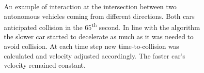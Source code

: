 \documentclass[11pt,english]{article}
\begin{document}
\begin{figure}[!] %
\caption{An example of interaction at the intersection between two autonomous vehicles coming from different directions. Both cars anticipated collision in the 65\textsuperscript{th} second. In line with the algorithm the slower car started to decelerate as much as it was needed to avoid collision. At each time step new time-to-collision was calculated and velocity adjusted accordingly. The faster car's velocity remained constant.}
\label{fig:interactions_example_2}
\end{figure}















\end{document}
